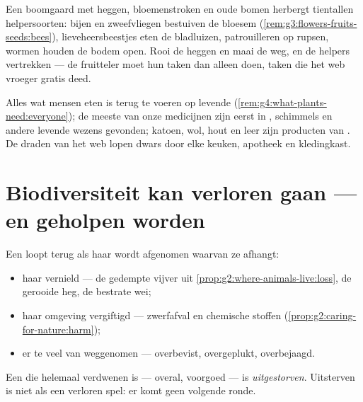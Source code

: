 \begin{example}[De boomgaardtest]\label{ex:g5:biodiversity:orchard}
Een boomgaard met heggen, bloemenstroken en oude bomen herbergt
tientallen helpersoorten: bijen en zweefvliegen bestuiven de bloesem
(\cref{rem:g3:flowers-fruits-seeds:bees}), lieveheersbeestjes eten de
bladluizen,  patrouilleren op rupsen, wormen houden de bodem open.
Rooi de heggen en maai de  weg, en de helpers vertrekken --- de
fruitteler moet hun taken dan alleen doen, taken die het web vroeger
gratis deed.
\end{example}

\begin{example}\label{ex:g5:biodiversity:people}
Alles wat mensen eten is terug te voeren op levende 
(\cref{rem:g4:what-plants-need:everyone}); de meeste van onze medicijnen
zijn eerst in , schimmels en andere levende wezens gevonden;
katoen, wol, hout en leer zijn producten van . De draden van het
web lopen dwars door elke keuken, apotheek en kledingkast.
\end{example}

\section{Biodiversiteit kan verloren gaan --- en geholpen worden}

\begin{proposition}\label{prop:g5:biodiversity:loss}
Een  loopt terug als haar wordt afgenomen waarvan ze afhangt:
\begin{itemize}
  \item haar \emph{} vernield --- de gedempte vijver uit
        \cref{prop:g2:where-animals-live:loss}, de gerooide heg, de
        bestrate wei;
  \item haar omgeving vergiftigd --- zwerfafval en chemische stoffen
        (\cref{prop:g2:caring-for-nature:harm});
  \item er te veel van weggenomen --- overbevist, overgeplukt,
        overbejaagd.
\end{itemize}
Een  die helemaal verdwenen is --- overal, voorgoed --- is
\emph{uitgestorven}. Uitsterven is niet als een
verloren spel: er komt geen volgende ronde.
\end{proposition}
\admitted

